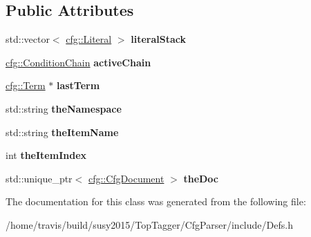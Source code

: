 \subsection*{Public Attributes}
\begin{DoxyCompactItemize}
\item 
\hypertarget{classCfgBuilder_aa4534dcb2ec75d02d178b24c9cf30b8d}{std\-::vector$<$ \hyperlink{classcfg_1_1Literal}{cfg\-::\-Literal} $>$ {\bfseries literal\-Stack}}\label{classCfgBuilder_aa4534dcb2ec75d02d178b24c9cf30b8d}

\item 
\hypertarget{classCfgBuilder_ac326d1e9426b9d15afae30a4f6c1313f}{\hyperlink{classcfg_1_1ConditionChain}{cfg\-::\-Condition\-Chain} {\bfseries active\-Chain}}\label{classCfgBuilder_ac326d1e9426b9d15afae30a4f6c1313f}

\item 
\hypertarget{classCfgBuilder_ab376ec6aad26f59bf931c3e6f5c2b20f}{\hyperlink{classcfg_1_1Term}{cfg\-::\-Term} $\ast$ {\bfseries last\-Term}}\label{classCfgBuilder_ab376ec6aad26f59bf931c3e6f5c2b20f}

\item 
\hypertarget{classCfgBuilder_a5dcb7004ac3ff2ee353c828339343569}{std\-::string {\bfseries the\-Namespace}}\label{classCfgBuilder_a5dcb7004ac3ff2ee353c828339343569}

\item 
\hypertarget{classCfgBuilder_a103ff056b767b8456ae538f26370ba78}{std\-::string {\bfseries the\-Item\-Name}}\label{classCfgBuilder_a103ff056b767b8456ae538f26370ba78}

\item 
\hypertarget{classCfgBuilder_a2f69af14667df0c44f4052f653bd6067}{int {\bfseries the\-Item\-Index}}\label{classCfgBuilder_a2f69af14667df0c44f4052f653bd6067}

\item 
\hypertarget{classCfgBuilder_acdcea7422a4c083bd0dc6dfb27ea10b1}{std\-::unique\-\_\-ptr$<$ \hyperlink{classcfg_1_1CfgDocument}{cfg\-::\-Cfg\-Document} $>$ {\bfseries the\-Doc}}\label{classCfgBuilder_acdcea7422a4c083bd0dc6dfb27ea10b1}

\end{DoxyCompactItemize}


The documentation for this class was generated from the following file\-:\begin{DoxyCompactItemize}
\item 
/home/travis/build/susy2015/\-Top\-Tagger/\-Cfg\-Parser/include/Defs.\-h\end{DoxyCompactItemize}
